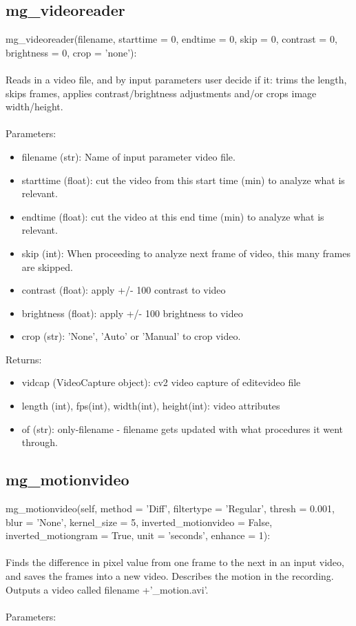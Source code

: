 \documentclass[9pt]{extarticle}
\begin{document}
\subsection{mg\_videoreader}
    mg\_videoreader(filename, starttime = 0, endtime = 0, skip = 0, contrast = 0, brightness = 0, crop = 'none'):
    \\\\
    Reads in a video file, and by input parameters user decide if it: trims the length, skips frames, applies contrast/brightness adjustments and/or crops image width/height.
    \\\\
    Parameters:
    \begin{itemize}
     \item [] filename (str): Name of input parameter video file.
     \item [] starttime (float): cut the video from this start time (min) to analyze what is relevant.
     \item [] endtime (float): cut the video at this end time (min) to analyze what is relevant.
     \item [] skip (int): When proceeding to analyze next frame of video, this many frames are skipped.
     \item [] contrast (float): apply +/- 100 contrast to video
     \item [] brightness (float): apply +/- 100 brightness to video
     \item [] crop (str): 'None', 'Auto' or 'Manual' to crop video.
    \end{itemize}
    Returns:
    \begin{itemize}
    \item [] vidcap (VideoCapture object): cv2 video capture of editevideo file
    \item [] length (int), fps(int), width(int), height(int): video attributes
     \item [] of (str): only-filename - filename gets updated with what procedures it went through.
 \end{itemize}

\subsection{mg\_motionvideo}    
    mg\_motionvideo(self, method = 'Diff', filtertype = 'Regular', thresh = 0.001, blur = 'None', kernel\_size = 5, inverted\_motionvideo = False, inverted\_motiongram = True, unit = 'seconds', enhance = 1):
    \\\\
    Finds the difference in pixel value from one frame to the next in an input video, and saves the frames into a new video.
    Describes the motion in the recording.    
    Outputs a video called filename +'\_motion.avi'.
    \\\\
    Parameters:
    
\end{document}
